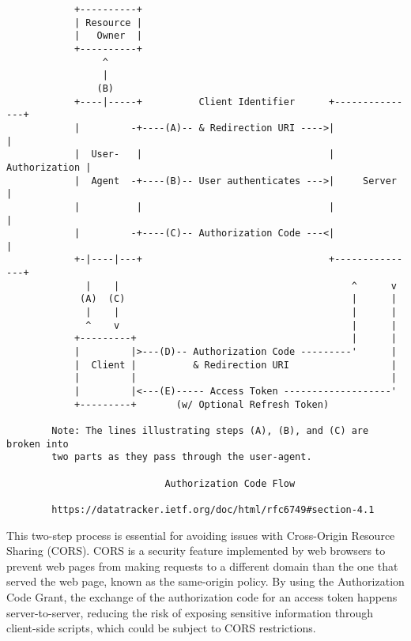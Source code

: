 \begin{tcolorbox}
\begin{scriptsize}
\begin{verbatim}
            +----------+
            | Resource |
            |   Owner  |
            +----------+
                 ^
                 |
                (B)
            +----|-----+          Client Identifier      +---------------+
            |         -+----(A)-- & Redirection URI ---->|               |
            |  User-   |                                 | Authorization |
            |  Agent  -+----(B)-- User authenticates --->|     Server    |
            |          |                                 |               |
            |         -+----(C)-- Authorization Code ---<|               |
            +-|----|---+                                 +---------------+
              |    |                                         ^      v
             (A)  (C)                                        |      |
              |    |                                         |      |
              ^    v                                         |      |
            +---------+                                      |      |
            |         |>---(D)-- Authorization Code ---------'      |
            |  Client |          & Redirection URI                  |
            |         |                                             |
            |         |<---(E)----- Access Token -------------------'
            +---------+       (w/ Optional Refresh Token)

        Note: The lines illustrating steps (A), (B), and (C) are broken into
        two parts as they pass through the user-agent.

                            Authorization Code Flow

        https://datatracker.ietf.org/doc/html/rfc6749#section-4.1
\end{verbatim}
\end{scriptsize}
\end{tcolorbox}

This two-step process is essential for avoiding issues with Cross-Origin Resource Sharing (CORS). CORS is a security feature implemented by web browsers to prevent web pages from making requests to a different domain than the one that served the web page, known as the same-origin policy. By using the Authorization Code Grant, the exchange of the authorization code for an access token happens server-to-server, reducing the risk of exposing sensitive information through client-side scripts, which could be subject to CORS restrictions.

